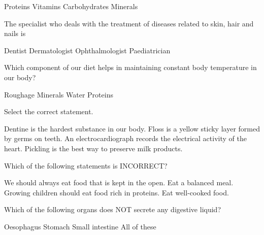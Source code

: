 \documentclass[a4paper]{exam}
\begin{document}
\begin{questions}
\begin{oneparchoices}
    \choice Proteins
    \choice Vitamins
    \choice Carbohydrates
    \choice Minerals
\end{oneparchoices}

\question The specialist who deals with the treatment of diseases related to skin, hair and nails is \hrulefill

\begin{oneparchoices}
    \choice Dentist
    \choice Dermatologist
    \choice Ophthalmologist
    \choice Paediatrician
\end{oneparchoices}

\question Which component of our diet helps in maintaining constant body temperature in our body?

\begin{oneparchoices}
    \choice Roughage
    \choice Minerals
    \choice Water
    \choice Proteins
\end{oneparchoices}

\question Select the correct statement.

\begin{oneparchoices}
    \choice Dentine is the hardest substance in our body.
    \newline
    \choice Floss is a yellow sticky layer formed by germs on teeth.
    \newline
    \choice An electrocardiograph records the electrical activity of the heart.
    \newline
    \choice Pickling is the best way to preserve milk products.
\end{oneparchoices}

\question Which of the following statements is INCORRECT?

\begin{oneparchoices}
    \choice We should always eat food that is kept in the open.
    \newline
    \choice Eat a balanced meal.
    \newline
    \choice Growing children should eat food rich in proteins.
    \newline
    \choice Eat well-cooked food.
\end{oneparchoices}

\question Which of the following organs does NOT secrete any digestive liquid?

\begin{oneparchoices}
    \choice Oesophagus
    \choice Stomach
    \choice Small intestine
    \choice All of these
\end{oneparchoices}


\end{questions}
\end{document}
